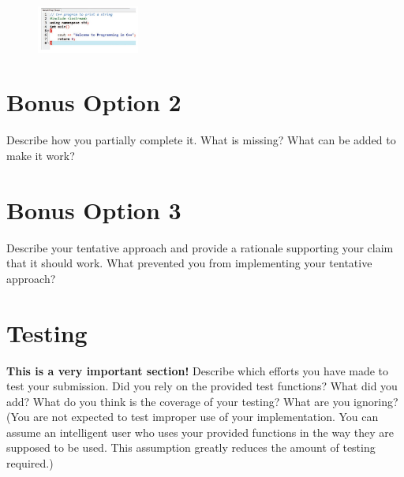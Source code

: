 \documentclass{article}
\begin{document}
\begin{figure}[!h]
\centering
\includegraphics[width=0.3\textwidth]{figs/code_screen_shot.jpg}
\end{figure}

\section*{Bonus Option 2}
Describe how you partially complete it. What is missing? What can be added to make it work?
\section*{Bonus Option 3}
Describe your tentative approach and provide a rationale supporting your claim that it should work. What prevented you from implementing your tentative approach? 

\section*{Testing}
{\bf This is a very important section!} Describe which efforts you have made to test your submission. Did you rely on the provided test functions? What did you add? What do you think is the coverage of your testing? What are you ignoring? (You are not expected to test improper use of your implementation. You can assume an intelligent user who uses your provided functions in the way they are supposed to be used. This assumption greatly reduces the amount of testing required.)
\end{document}
